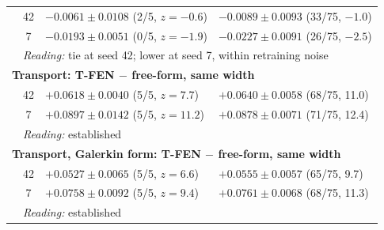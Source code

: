 \begin{table}[!h]
\begin{tabular}{l c l l}
    & 42 & $-0.0061 \pm 0.0108$ (2/5, $z = -0.6$) & $-0.0089 \pm 0.0093$ (33/75, $-1.0$) \\
    & 7  & $-0.0193 \pm 0.0051$ (0/5, $z = -1.9$) & $-0.0227 \pm 0.0091$ (26/75, $-2.5$) \\
    & \multicolumn{3}{l}{\emph{Reading:} tie at seed 42; lower at seed 7,
      within retraining noise} \\[2pt]
    \multicolumn{4}{l}{\textbf{Transport: T-FEN $-$ free-form, same width}} \\
    & 42 & $+0.0618 \pm 0.0040$ (5/5, $z = 7.7$) & $+0.0640 \pm 0.0058$ (68/75, 11.0) \\
    & 7  & $+0.0897 \pm 0.0142$ (5/5, $z = 11.2$) & $+0.0878 \pm 0.0071$ (71/75, 12.4) \\
    & \multicolumn{3}{l}{\emph{Reading:} established} \\[2pt]
    \multicolumn{4}{l}{\textbf{Transport, Galerkin form: T-FEN $-$ free-form, same width}} \\
    & 42 & $+0.0527 \pm 0.0065$ (5/5, $z = 6.6$) & $+0.0555 \pm 0.0057$ (65/75, 9.7) \\
    & 7  & $+0.0758 \pm 0.0092$ (5/5, $z = 9.4$) & $+0.0761 \pm 0.0068$ (68/75, 11.3) \\
    & \multicolumn{3}{l}{\emph{Reading:} established} \\
    \bottomrule
  \end{tabular}
\end{table}

